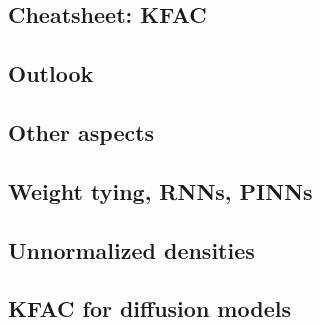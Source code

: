 \documentclass{article}
\begin{document}
\clearpage

\begin{paracol}{1}
  \section{Cheatsheet: KFAC}
  
  \end{paracol}
\clearpage


\begin{paracol}{1}
  \section{Outlook}
  

\end{paracol}

\clearpage

\begin{paracol}{2}
  \section{Other aspects}
  \subsection{Weight tying, RNNs, PINNs}
  \subsection{Unnormalized densities}
  \subsection{KFAC for diffusion models}
\end{paracol}

\clearpage


\appendix
\end{document}
